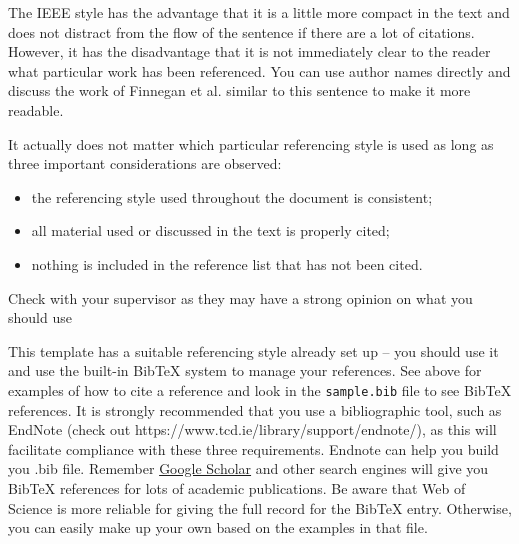 The IEEE style has the advantage that it is a little more compact in the text and does not distract from the flow of the sentence if there are a lot of citations. However, it has the disadvantage that it is not immediately clear to the reader what particular work has been referenced. You can use author names directly and discuss the work of Finnegan et al. \cite{finnegan2010experimental} similar to this sentence to make it more readable. 

It actually does not matter which particular referencing style is used as long as three important considerations are observed:
\begin{itemize}
\item the referencing style used throughout the document is consistent;
\item all material used or discussed in the text is properly cited;
\item nothing is included in the reference list that has not been cited.
\end{itemize}

Check with your supervisor as they may have a strong opinion on what you should use

This template has a suitable referencing style already set up -- you should use it and use the built-in BibTeX system to manage your references. See above for examples of how to cite a reference and look in the \texttt{sample.bib} file to see BibTeX references. It is strongly recommended that you use a bibliographic tool, such as EndNote (check out https://www.tcd.ie/library/support/endnote/), as this will facilitate compliance with these three requirements. Endnote can help you build you .bib file. Remember \href{http://scholar.google.com}{Google Scholar} and other search engines will give you BibTeX references for lots of academic publications. Be aware that Web of Science is more reliable for giving the full record for the BibTeX entry. Otherwise, you can easily make up your own based on the examples in that file.
